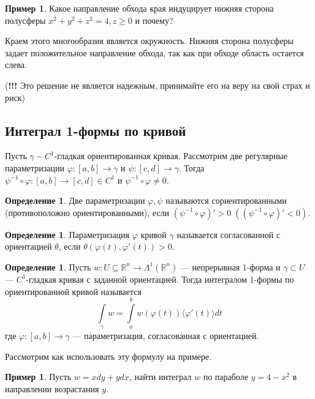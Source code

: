 \documentclass[a5paper]{article}
\newcounter{through}
\theoremstyle{plain}
\theoremstyle{definition}
\newtheorem{definition}[through]{Определение}
\newtheorem{example}[through]{Пример}
\numberwithin{through}{section}
\numberwithin{equation}{section}
\begin{document}
\begin{example}\label{potv2c}
	Какое направление обхода края индуцирует нижняя сторона полусферы
	$x^2 + y^2 + z^2 = 4, z \geq 0$ и почему?
	
	Краем этого многообразия является окружность. Нижняя сторона полусферы задает положительное направление обхода, так как при обходе область остается слева.
	
	(\textbf{!!!} Это решение не является надежным, принимайте его на веру на свой страх и риск)
\end{example}


\subsection{Интеграл 1-формы по кривой} %

Пусть $\gamma - C^1$-гладкая ориентированная кривая. Рассмотрим две регулярные параметризации $\varphi:
[a, b] \to \gamma$ и $\psi: [c, d] \to \gamma$. Тогда $\psi^{-1} \circ \varphi : [a, b] \to [c, d] \in C^1$ и $\psi^{-1} \circ \varphi \not= 0$.

\begin{definition}
	Две параметризации $\varphi, \psi$ называются сориентированными (противоположно ориентированными), если $(\psi^{-1} \circ \varphi)' > 0 \; ((\psi^{-1} \circ \varphi)' < 0)$.
\end{definition}

\begin{definition}
	Параметризация $\varphi$ кривой $\gamma$ называется согласованной с ориентацией $\theta$, если $\theta(\varphi(t), \varphi'(t))>0$.
\end{definition}

\begin{definition}\label{CurveInt1fprm}
	Пусть $w : U \subseteq \mathbb{R}^n \to \Lambda^1(\mathbb{R}^n)$ --- непрерывная 1-форма и $\gamma \subset U$ --- $C^1$-гладкая кривая с заданной ориентацией. Тогда интегралом 1-формы по ориентированной кривой называется \[\int\limits_{\gamma} w = \int\limits_{a}^{b} w(\varphi(t)) \langle \varphi'(t) \rangle dt\] где $\varphi : [a, b] \to \gamma$ --- параметризация, согласованная с ориентацией.
\end{definition}

Рассмотрим как использовать эту формулу на примере.

\begin{example}
	Пусть $w = xdy + ydx$, найти интеграл $w$ по параболе $y = 4 - x^2$ в направлении возрастания $y$.
\end{example}
\end{document}
